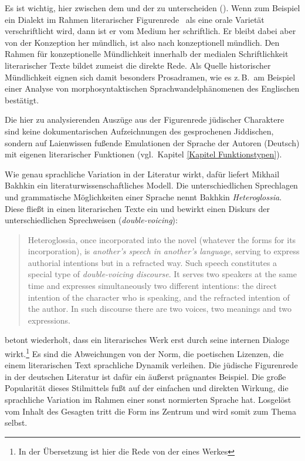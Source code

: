 Es ist
wichtig, %
 hier zwischen dem  und der  zu unterscheiden (\citealt[587]{kochoesterreicher1994}). Wenn zum Beispiel ein Dialekt im Rahmen literarischer Figurenrede \,%
als eine orale Varietät \,%
verschriftlicht wird, dann ist er vom Medium her schriftlich. Er bleibt dabei aber von der Konzeption her mündlich, ist also nach \cite{KochOesterreicher1985} konzeptionell mündlich. Den Rahmen für konzeptionelle Mündlichkeit innerhalb der medialen Schriftlichkeit literarischer Texte bildet zumeist die direkte Rede. Als Quelle historischer Mündlichkeit eignen sich damit besonders Prosadramen,  wie es z.\,B.\, \textcite{Vosberg2016} am Beispiel einer Analyse von morphosyntaktischen Sprachwandelphänomenen des Englischen bestätigt.

Die hier zu analysierenden Auszüge aus der Figurenrede jüdischer Charaktere sind keine dokumentarischen Aufzeichnungen des gesprochenen Jiddischen, sondern auf Laienwissen fußende Emulationen der Sprache der Autoren (Deutsch) mit eigenen literarischer Funktionen (vgl.\, Kapitel \ref{Kapitel Funktionstypen}). 

Wie genau sprachliche Variation in der Literatur wirkt, dafür liefert Mikhail Bakhkin ein literaturwissenschaftliches Modell. Die unterschiedlichen Sprechlagen und grammatische Möglichkeiten einer Sprache nennt Bakhkin \textit{Heteroglossia}. Diese fließt in einen literarischen Texte ein und  bewirkt einen Diskurs der unterschiedlichen Sprechweisen (\textit{double-voicing}):

\begin{quote}
Heteroglossia, once incorporated into the novel (whatever the forms for its incorporation), is \textit{another's speech in another's language}, serving to express authorial intentions but in a refracted way. Such speech constitutes a special type of  \textit{double-voicing discourse}. It serves two speakers at the same time and expresses simultaneously two different intentions: the direct intention of the character who is speaking, and the refracted intention of the author. In such discourse there are two voices, two meanings and two expressions. \cite[324]{Bakhtin1981}
\end{quote}

\noindent \cite[u.\,a.\, 279, 285, 369, 418]{Bakhtin1981} betont wiederholt, dass ein literarisches Werk erst durch seine internen Dialoge wirkt.\footnote{In der Übersetzung ist hier die Rede von der 
eines Werkes} %
Es sind die Abweichungen von der Norm, die poetischen Lizenzen, die einem literarischen Text sprachliche Dynamik verleihen. Die jüdische Figurenrede in der deutschen Literatur ist dafür ein äußerst prägnantes Beispiel. Die große Popularität dieses Stilmittels fußt auf der einfachen und direkten Wirkung, die sprachliche Variation im Rahmen einer sonst normierten Sprache hat. Losgelöst vom Inhalt des Gesagten tritt die Form ins Zentrum und wird somit zum Thema selbst.

